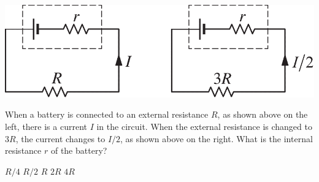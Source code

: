\begin{center}
    \includegraphics[scale=0.3]{images/img-014-030.png}
\end{center}

\begin{questions}\setcounter{question}{28}\question
When a battery is connected to an external resistance $R$, as shown above on the left, there is a current $I$ in the circuit. When the external resistance is changed to $3R$, the current changes to $I / 2$, as shown above on the right. What is the internal resistance $r$ of the battery?

\begin{oneparchoices}
    \choice $R / 4$
    \choice $R / 2$
    \choice $R$
    \choice $2R$
    \choice $4R$
\end{oneparchoices}
\end{questions}
